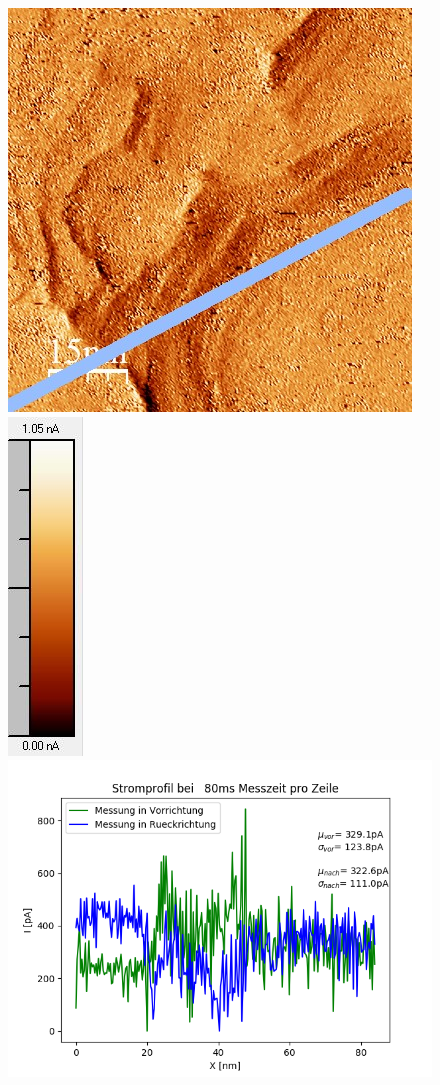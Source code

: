 \documentclass[12pt,a4paper]{article}
\begin{document}
\begin{figure}[H]
\includegraphics[scale=0.6]{Bilder/Anhang/Zeit/Strom/0_080_Zeit_nach_Strom.jpg}
\includegraphics[scale=0.6]{Bilder/Anhang/Zeit/Strom/0_080_Zeit_nach_Strom_Skala.jpg}
\includegraphics[scale=0.5]{Bilder/Anhang/Zeit/Strom/Strom_Profil_Zeit_0080.png}

\end{figure}
\end{document}
